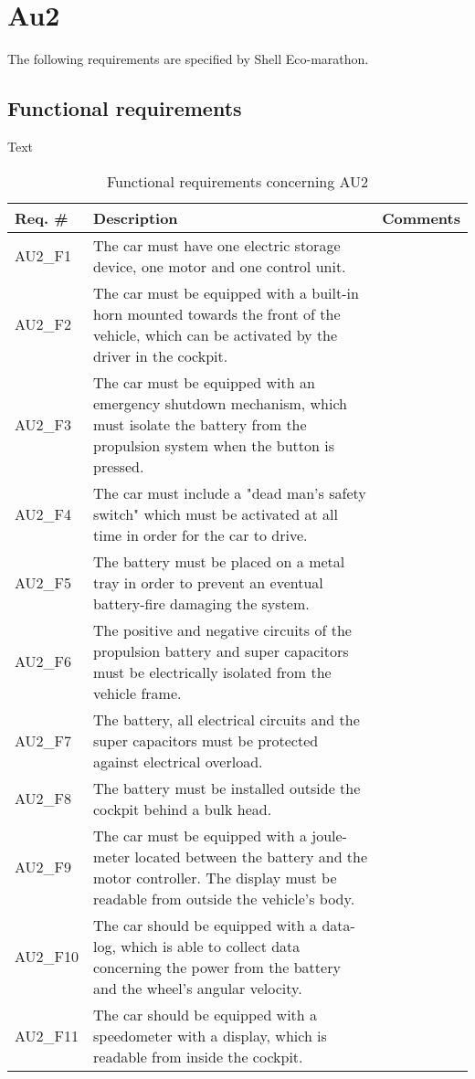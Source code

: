 \section{Au2}
The following requirements are specified by Shell Eco-marathon.

\subsection{Functional requirements}
Text

\begin{table}[h!]
	\centering
	\label{my-label}
	\begin{tabular}{|p{2 cm}|p{7 cm}|p{4 cm}|}
		\hline
		\textbf{Req. \#} & \textbf{Description} & \textbf{Comments} \\\hline
		AU2\_F1		& The car must have one electric storage device, one motor and one control unit. &   \\\hline
		AU2\_F2		& The car must be equipped with a built-in horn mounted towards the front of the vehicle, which can be activated by the driver in the cockpit. &   \\\hline
		AU2\_F3		& The car must be equipped with an emergency shutdown mechanism, which must isolate the battery from the propulsion system when the button is pressed. &   \\\hline
		AU2\_F4		& The car must include a "dead man's safety switch" which must be activated at all time in order for the car to drive. &   \\\hline
		AU2\_F5		& The battery must be placed on a metal tray in order to prevent an eventual battery-fire damaging the system. &   \\\hline
		AU2\_F6		& The positive and negative circuits of the propulsion battery and super capacitors must be electrically isolated from the vehicle frame. &   \\\hline
		AU2\_F7		& The battery, all electrical circuits and the super capacitors must be protected against electrical overload. &   \\\hline
		AU2\_F8		& The battery must be installed outside the cockpit behind a bulk head. &   \\\hline
		AU2\_F9		& The car must be equipped with a joule-meter located between the battery and the motor controller. The display must be readable from outside the vehicle's body. &   \\\hline
		AU2\_F10	& The car should be equipped with a data-log, which is able to collect data concerning the power from the battery and the wheel's angular velocity. &   \\\hline
		AU2\_F11	& The car should be equipped with a speedometer with a display, which is readable from inside the cockpit. &   \\\hline
	\end{tabular}
	\caption{Functional requirements concerning AU2}
\end{table}

